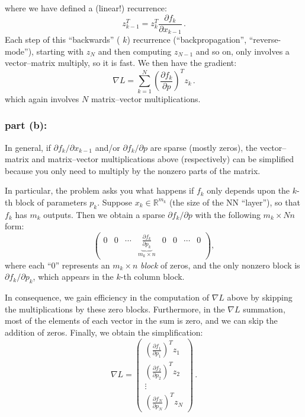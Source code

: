 \documentclass[10pt,oneside]{article}
\begin{document}
where we have defined a (linear!) recurrence:
$$
\boxed{z_{k-1}^T = z_k^T  \frac{\partial f_k}{\partial x_{k-1}}} \, .
$$
Each step of this ``backwards'' ( $k$) recurrence (``backpropagation'', ``reverse-mode''), starting with $z_N$ and then computing $z_{N-1}$ and so on, only involves a vector--matrix multiply, so it is fast.  We then have the gradient:
$$
\boxed{\nabla L = \sum_{k=1}^N  \left(\frac{\partial f_k}{\partial p}\right)^T z_k} \, .
$$
which again involves $N$ matrix--vector multiplications.

\subsubsection*{part (b):}

In general, if $\partial f_k/ \partial x_{k-1}$ and/or $\partial f_k / \partial p$ are sparse (mostly zeros), the vector--matrix and matrix--vector multiplications above (respectively) can be simplified because you only need to multiply by the nonzero parts of the matrix.

In particular, the problem asks you what happens if $f_k$ only depends upon the $k$-th block of parameters $p_k$.  Suppose $x_k \in \mathbb{R}^{m_k}$ (the size of the NN ``layer''), so that $f_k$ has $m_k$ outputs. Then we obtain a sparse $\partial f_k /\partial p$ with the following $m_k \times Nn$ form:
$$
\begin{pmatrix}
0 & 0 & \cdots & \underbrace{\frac{\partial f_k}{\partial p_k}}_{m_k \times n} & 0 & 0 & \cdots & 0
\end{pmatrix} ,
$$
where each ``$0$'' represents an $m_k \times n$ \emph{block} of zeros, and the only nonzero block is $\partial f_k/ \partial p_k$, which appears in the $k$-th column block.

In consequence, we gain efficiency in the computation of $\nabla L$ above by skipping the multiplications by these zero blocks.  Furthermore, in the $\nabla L$ summation, most of the elements of each vector in the sum is zero, and we can skip the addition of zeros.  Finally, we obtain the simplification:
$$
\boxed{
\nabla L =
\begin{pmatrix}
\left(\frac{\partial f_1}{\partial p_1}\right)^T z_1 \\
\left(\frac{\partial f_2}{\partial p_2}\right)^T z_2 \\
\vdots
\\
\left(\frac{\partial f_N}{\partial p_N}\right)^T z_N
\end{pmatrix} } \, .
$$
\end{document}
